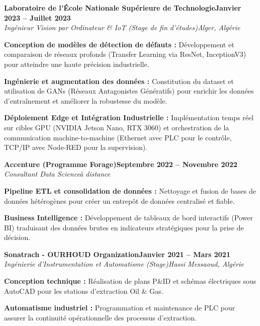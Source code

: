 \documentclass[letterpaper,10pt]{article}
\newcommand{\heading}[2]{
  \hspace{10pt}#1\hfill#2\\
}
\newcommand{\headingBf}[2]{
  \heading{\textbf{#1}}{\textbf{#2}}
}
\newcommand{\headingIt}[2]{
  \heading{\textit{#1}}{\textit{#2}}
}
\newenvironment{resume_list}{
  \vspace{-7pt}
  \begin{itemize}[itemsep=-2px, parsep=1pt, leftmargin=30pt]
}{
  \end{itemize}
}
\begin{document}
\headingBf{Laboratoire de l’École Nationale Supérieure de Technologie}{Janvier 2023 -- Juillet 2023}
\headingIt{Ingénieur Vision par Ordinateur \& IoT (Stage de fin d'études)}{Alger, Algérie}
\begin{resume_list}
  \item \textbf{Conception de modèles de détection de défauts :} Développement et comparaison de réseaux profonds (Transfer Learning via ResNet, InceptionV3) pour atteindre une haute précision industrielle.
  \item \textbf{Ingénierie et augmentation des données :} Constitution du dataset et utilisation de GANs (Réseaux Antagonistes Génératifs) pour enrichir les données d'entraînement et améliorer la robustesse du modèle.
  \item \textbf{Déploiement Edge et Intégration Industrielle :} Implémentation temps réel sur cibles GPU (NVIDIA Jetson Nano, RTX 3060) et orchestration de la communication machine-to-machine (Ethernet avec PLC pour le contrôle, TCP/IP avec Node-RED pour la supervision).
\end{resume_list}

\headingBf{Accenture (Programme Forage)}{Septembre 2022 -- Novembre 2022}
\headingIt{Consultant Data Science}{à distance}
\begin{resume_list}
  \item \textbf{Pipeline ETL et consolidation de données :} Nettoyage et fusion de bases de données hétérogènes pour créer un entrepôt de données centralisé et fiable.
  \item \textbf{Business Intelligence :} Développement de tableaux de bord interactifs (Power BI) traduisant des données brutes en indicateurs stratégiques pour la prise de décision.
\end{resume_list}

\headingBf{Sonatrach - OURHOUD Organization}{Janvier 2021 -- Mars 2021}
\headingIt{Ingénierie d’Instrumentation et Automatisme (Stage)}{Hassi Messaoud, Algérie}
\begin{resume_list}
  \item \textbf{Conception technique :} Réalisation de plans P\&ID et schémas électriques sous AutoCAD pour les stations d'extraction Oil \& Gas.
  \item \textbf{Automatisme industriel :} Programmation et maintenance de PLC pour assurer la continuité opérationnelle des processus d'extraction.
\end{resume_list}

\end{document}
